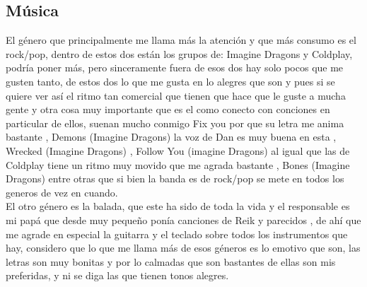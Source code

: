\documentclass[letterpaper, 12pt]{article}
\begin{document}
\subsection*{Música}
    
    El género que principalmente me llama más la atención y que más consumo es el rock/pop, dentro de estos dos están los grupos de: Imagine Dragons y Coldplay, podría poner más, pero sinceramente fuera de esos dos %
    hay solo pocos que me gusten tanto, de estos dos lo que me gusta en lo alegres que son y pues si se quiere ver así el ritmo tan comercial que tienen que hace que le guste a mucha gente %
    y otra cosa muy importante que es el como conecto con conciones en particular de ellos, suenan mucho conmigo Fix you por que su letra me anima bastante%
    , Demons (Imagine Dragons) la voz de Dan es muy buena en esta%
    , Wrecked (Imagine Dragons)%
    , Follow You (imagine Dragons) al igual que las de Coldplay tiene un ritmo muy movido que me agrada bastante%
    , Bones (Imagine Dragons) %
    entre otras que si bien la banda es de rock/pop se mete en todos los generos de vez en cuando.\\
    
    
    
    El otro género es la balada, que este ha sido de toda la vida y el responsable es mi papá que desde muy pequeño ponía canciones de Reik y parecidos%
    , de ahí que me agrade en especial la guitarra y el teclado sobre todos los instrumentos que hay, considero que lo que me llama más de esos géneros es lo emotivo que son, las letras son muy bonitas y por lo calmadas que son bastantes de ellas son mis preferidas, y ni se diga las que tienen tonos alegres.\\%
    
\end{document}
